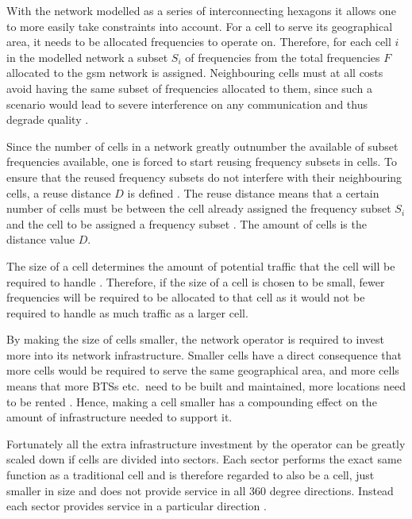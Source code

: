 With the network modelled as a series of interconnecting hexagons it allows one to more easily take constraints into account\cite{Eisenblatter}. For a cell to serve its geographical area, it needs to be allocated frequencies to operate on. Therefore, for each cell $i$ in the modelled network a subset $S_i$ of frequencies from the total frequencies $F$ allocated to the \gls{gsm} network is assigned\cite{GSMArchitectureProtocolsServices}. Neighbouring cells must at all costs avoid having the same subset of frequencies allocated to them, since such a scenario would lead to severe interference on any communication and thus degrade quality \cite{GSMArchitectureProtocolsServices}.

Since the number of cells in a network greatly outnumber the available of subset frequencies available, one is forced to start reusing frequency subsets in cells\cite{GSMArchitectureProtocolsServices}. To ensure that the reused frequency subsets do not interfere with their neighbouring cells, a reuse distance $D$ is defined \cite{GSMArchitectureProtocolsServices}. The reuse distance means that a certain number of cells must be between the cell already assigned the frequency subset $S_i$ and the cell to be assigned a frequency subset \cite{GSMArchitectureProtocolsServices}. The amount of cells is the distance value $D$.

The size of a cell determines the amount of potential traffic that the cell will be required to handle \cite{GSM92,Eisenblatter,GSMArchitectureProtocolsServices}. Therefore, if the size of a cell is chosen to be small, fewer frequencies will be required to be allocated to that cell as it would not be required to handle as much traffic as a larger cell\cite{GSMArchitectureProtocolsServices}. 

By making the size of cells smaller, the network operator is required to invest more into its network infrastructure. Smaller cells have a direct consequence that more cells would be required to serve the same geographical area, and more cells means that more \glspl{BTS} etc.\ need to be built and maintained, more locations need to be rented \cite{GSMArchitectureProtocolsServices}. Hence, making a cell smaller has a compounding effect on the amount of infrastructure needed to support it.

Fortunately all the extra infrastructure investment by the operator can be greatly scaled down if cells are divided into sectors\label{def:cellsector}. Each sector performs the exact same function as a traditional cell and is therefore regarded to also be a cell, just smaller in size and does not provide service in all 360 degree directions. Instead each sector provides service in a particular direction \cite{GSMArchitectureProtocolsServices,GSM92,GSMSysEngin}.

